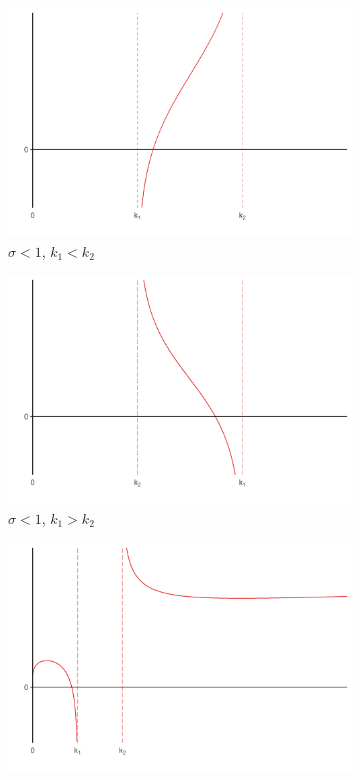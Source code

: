 \begin{figure}[tb]
	\begin{subfigure}[b]{0.5\linewidth}
		\centering
		\includegraphics[width=1\linewidth]{../result/appendix_A/function_g/graph_a.png} 
		\caption{$\sigma < 1$, $k_1 < k_2$} 
		\label{fig:g_shape_a}
	\end{subfigure}
	\begin{subfigure}[b]{0.5\linewidth}
		\centering
		\includegraphics[width=1\linewidth]{../result/appendix_A/function_g/graph_b.png} 
		\caption{$ \sigma < 1$, $k_1 > k_2$}
		\label{fig:g_shape_b}
	\end{subfigure}
	\begin{subfigure}[b]{0.5\linewidth}
		\centering
		\includegraphics[width=1\linewidth]{../result/appendix_A/function_g/graph_c.png} 

\end{subfigure}
\end{figure}
